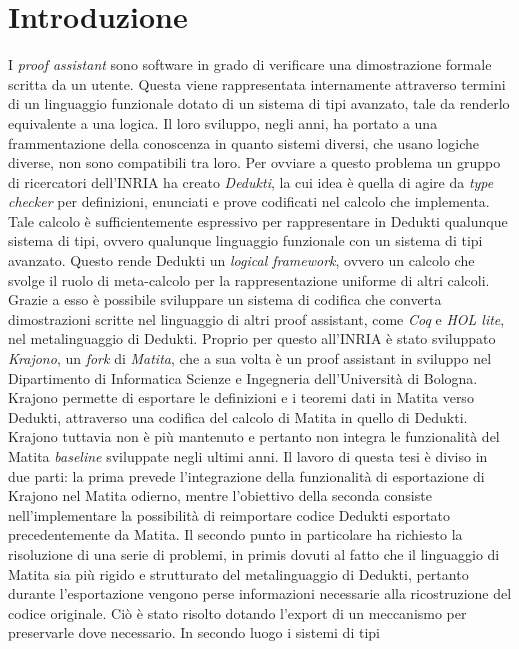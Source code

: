 \documentclass[12pt,a4paper]{mimosis}
\begin{document}
\chapter{Introduzione}
I \textit{proof assistant} sono software in grado di verificare una dimostrazione
formale scritta da un utente. Questa viene rappresentata internamente attraverso 
termini di un linguaggio funzionale dotato di un sistema di tipi avanzato, tale
da renderlo equivalente a una logica. Il loro sviluppo, negli anni, ha portato a una 
frammentazione della conoscenza in quanto sistemi diversi, che usano logiche diverse,
non sono compatibili tra loro. Per ovviare a questo problema un gruppo di ricercatori
dell'INRIA ha creato \textit{Dedukti}, la cui idea è quella di agire da \textit{type
checker} per definizioni, enunciati e prove codificati nel calcolo che implementa. 
Tale calcolo è sufficientemente espressivo per rappresentare in Dedukti qualunque
sistema di tipi, ovvero qualunque linguaggio funzionale con un sistema di tipi avanzato.
Questo rende Dedukti un \textit{logical framework}, ovvero un calcolo che svolge il 
ruolo di meta-calcolo per la rappresentazione uniforme di altri calcoli. Grazie a
esso è possibile sviluppare un sistema di codifica che converta dimostrazioni scritte
nel linguaggio di altri proof assistant, come \textit{Coq} e \textit{HOL lite}, nel
metalinguaggio di Dedukti. Proprio per questo all'INRIA è stato sviluppato \textit{Krajono},
un \textit{fork} di \textit{Matita}, che a sua volta è un proof assistant in sviluppo
nel Dipartimento di Informatica Scienze e Ingegneria dell'Università di Bologna.
Krajono permette di esportare le definizioni e i teoremi dati in Matita verso Dedukti,
attraverso una codifica del calcolo di Matita in quello di Dedukti. Krajono tuttavia 
non è più mantenuto e pertanto non integra le funzionalità del Matita \textit{baseline}
sviluppate negli ultimi anni. Il lavoro di questa tesi è diviso in due parti: la prima
prevede l'integrazione della funzionalità di esportazione di Krajono nel Matita odierno,
mentre l'obiettivo della seconda consiste nell'implementare la possibilità di reimportare
codice Dedukti esportato precedentemente da Matita. Il secondo punto in particolare 
ha richiesto la risoluzione di una serie di problemi, in primis dovuti al fatto che
il linguaggio di Matita sia più rigido e strutturato del metalinguaggio di Dedukti,
pertanto durante l'esportazione vengono perse informazioni necessarie alla
ricostruzione del codice originale. Ciò è stato risolto dotando l'export di
un meccanismo per preservarle dove necessario. In secondo luogo i sistemi di tipi
\end{document}
